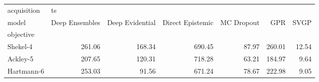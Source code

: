 \begin{tabular}{lrrrrrr}
\toprule
acquisition & \multicolumn{6}{l}{ts} \\
model & Deep Ensembles & Deep Evidential & Direct Epistemic & MC Dropout &     GPR &   SVGP \\
objective  &                &                 &                  &            &         &        \\
\midrule
Shekel-4   &         261.06 &          168.34 &           690.45 &      87.97 &  260.01 &  12.54 \\
Ackley-5   &         207.65 &          120.31 &           718.28 &      63.21 &  184.97 &   9.64 \\
Hartmann-6 &         253.03 &           91.56 &           671.24 &      78.67 &  222.98 &   9.05 \\
\bottomrule
\end{tabular}
